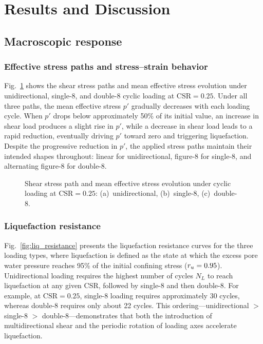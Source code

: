 \section{Results and Discussion}
\label{sec:results}

\subsection{Macroscopic response}
\label{subsec:macro_response}

\subsubsection{Effective stress paths and stress--strain behavior}

Fig.~\ref{fig:macro_response} shows the shear stress paths and mean effective stress evolution under unidirectional, single-8, and double-8 cyclic loading at $\mathrm{CSR} = 0.25$. Under all three paths, the mean effective stress $p'$ gradually decreases with each loading cycle. When $p'$ drops below approximately 50\% of its initial value, an increase in shear load produces a slight rise in $p'$, while a decrease in shear load leads to a rapid reduction, eventually driving $p'$ toward zero and triggering liquefaction. Despite the progressive reduction in $p'$, the applied stress paths maintain their intended shapes throughout: linear for unidirectional, figure-8 for single-8, and alternating figure-8 for double-8.

\begin{figure}
  \centering
  \hfill
  \hfill
  \caption{Shear stress path and mean effective stress evolution under cyclic loading
    at $\mathrm{CSR} = 0.25$:
    (a)~unidirectional, (b)~single-8, (c)~double-8.}
  \label{fig:macro_response}
\end{figure}

\subsubsection{Liquefaction resistance}

Fig.~\ref{fig:liq_resistance} presents the liquefaction resistance curves for the three loading types, where liquefaction is defined as the state at which the excess pore water pressure reaches 95\% of the initial confining stress ($r_u = 0.95$). Unidirectional loading requires the highest number of cycles $N_L$ to reach liquefaction at any given CSR, followed by single-8 and then double-8. For example, at $\mathrm{CSR} = 0.25$, single-8 loading requires approximately 30 cycles, whereas double-8 requires only about 22 cycles. This ordering---unidirectional $>$ single-8 $>$ double-8---demonstrates that both the introduction of multidirectional shear and the periodic rotation of loading axes accelerate liquefaction.

